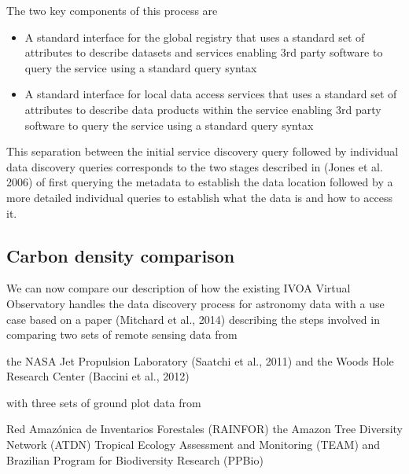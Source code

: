 \documentclass{article}
\begin{document}
The two key components of this process are
\begin{itemize}
  \item A standard interface for the global registry
that uses a standard set of attributes to describe datasets and services
enabling 3rd party software to query the service using a standard query syntax
  \item A standard interface for local data access services
that uses a standard set of attributes to describe data products within the service
enabling 3rd party software to query the service using a standard query syntax
\end{itemize}

This separation between the initial service discovery query
followed by individual data discovery queries
corresponds to the two stages described in (Jones et al. 2006)
of first querying the metadata to establish the data location
followed by a more detailed individual queries
to establish what the data is and how to access it. 

\subsection{Carbon density comparison}

We can now compare our description of how the existing IVOA Virtual Observatory
handles the data discovery process for astronomy data with a use case
based on a paper
(Mitchard et al., 2014)
describing the steps involved in comparing two sets of remote sensing data from

the NASA Jet Propulsion Laboratory
(Saatchi et al., 2011)
and the Woods Hole Research Center
(Baccini et al., 2012)

with three sets of ground plot data from

Red Amazónica de Inventarios Forestales (RAINFOR)
the Amazon Tree Diversity Network (ATDN)
Tropical Ecology Assessment and Monitoring (TEAM)
and
Brazilian Program for Biodiversity Research (PPBio)
\end{document}
